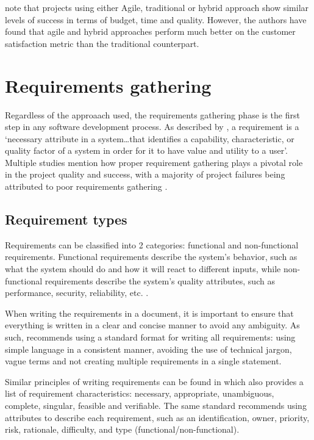 \textcite{hybrid1} note that projects using either Agile, traditional or hybrid approach show similar levels of success in terms of budget, time and quality. However, the authors have found that agile and hybrid approaches perform much better on the customer satisfaction metric than the traditional counterpart.

\section{Requirements gathering}

Regardless of the approaach used, the requirements gathering phase is the first step in any software development process. As described by \textcite{reqanalysis2}, a requirement is a `necessary attribute in a system\ldots that identifies a capability, characteristic, or quality factor of a system in order for it to have value and utility to a user'. Multiple studies mention how proper requirement gathering plays a pivotal role in the project quality and success, with a majority of project failures being attributed to poor requirements gathering \parencite{reqanalysis1, reqanalysis3, reqanalysis5}.

\subsection{Requirement types}

Requirements can be classified into 2 categories: functional and non-functional requirements. Functional requirements describe the system's behavior, such as what the system should do and how it will react to different inputs, while non-functional requirements describe the system's quality attributes, such as performance, security, reliability, etc. \parencite[6]{requirements}.

When writing the requirements in a document, it is important to ensure that everything is written in a clear and concise manner to avoid any ambiguity. As such, \textcite[112]{requirements} recommends using a standard format for writing all requirements: using simple language in a consistent manner, avoiding the use of technical jargon, vague terms and not creating multiple requirements in a single statement.

Similar principles of writing requirements can be found in \textcite{requirements2} which also provides a list of requirement characteristics: necessary, appropriate, unambiguous, complete, singular, feasible and verifiable. The same standard recommends using attributes to describe each requirement, such as an identification, owner, priority, risk, rationale, difficulty, and type (functional/non-functional).

